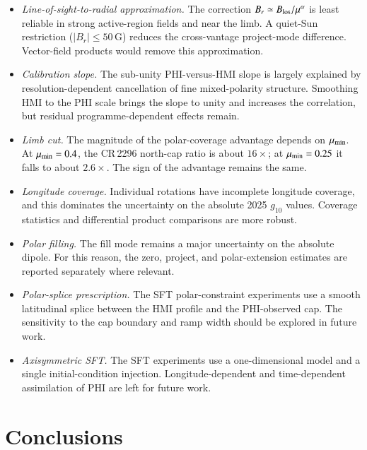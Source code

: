 \documentclass{aa}
\begin{document}
\begin{itemize}
    \item \emph{Line-of-sight-to-radial approximation.} The correction $B_r\simeq B_{\rm los}/\mu^{\alpha}$ is least reliable in strong active-region fields and near the limb. A quiet-Sun restriction ($|B_r|\le50$\,G) reduces the cross-vantage project-mode difference. Vector-field products would remove this approximation.
    \item \emph{Calibration slope.} The sub-unity PHI-versus-HMI slope is largely explained by resolution-dependent cancellation of fine mixed-polarity structure. Smoothing HMI to the PHI scale brings the slope to unity and increases the correlation, but residual programme-dependent effects remain.
    \item \emph{Limb cut.} The magnitude of the polar-coverage advantage depends on $\mu_{\rm min}$. At $\mu_{\rm min}=0.4$, the CR\,2296 north-cap ratio is about $16\times$; at $\mu_{\rm min}=0.25$ it falls to about $2.6\times$. The sign of the advantage remains the same.
    \item \emph{Longitude coverage.} Individual rotations have incomplete longitude coverage, and this dominates the uncertainty on the absolute 2025 $g_{10}$ values. Coverage statistics and differential product comparisons are more robust.
    \item \emph{Polar filling.} The fill mode remains a major uncertainty on the absolute dipole. For this reason, the zero, project, and polar-extension estimates are reported separately where relevant.
    \item \emph{Polar-splice prescription.} The SFT polar-constraint experiments use a smooth latitudinal splice between the HMI profile and the PHI-observed cap. The sensitivity to the cap boundary and ramp width should be explored in future work.
    \item \emph{Axisymmetric SFT.} The SFT experiments use a one-dimensional model and a single initial-condition injection. Longitude-dependent and time-dependent assimilation of PHI are left for future work.
\end{itemize}

\section{Conclusions}
\label{sec:conclusions}
\end{document}
